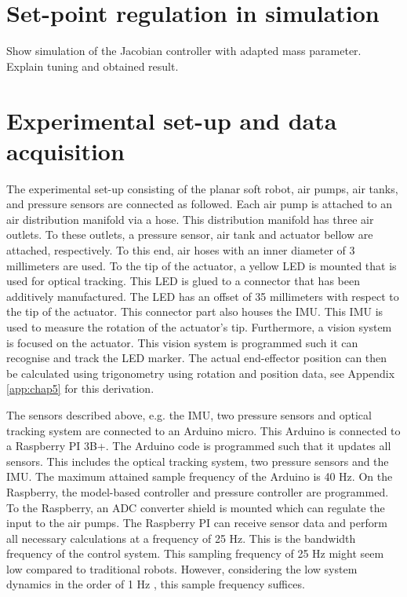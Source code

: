 \section{Set-point regulation in simulation}

Show simulation of the Jacobian controller with adapted mass parameter. Explain tuning and obtained result.


\section{Experimental set-up and data acquisition}

The experimental set-up consisting of the planar soft robot, air pumps, air tanks, and pressure sensors are connected as followed. Each air pump is attached to an air distribution manifold via a hose. This distribution manifold has three air outlets. To these outlets, a pressure sensor, air tank and actuator bellow are attached, respectively. To this end, air hoses with an inner diameter of 3 millimeters are used. To the tip of the actuator, a yellow LED is mounted that is used for optical tracking. This LED is glued to a connector that has been additively manufactured. The LED has an offset of 35 millimeters with respect to the tip of the actuator. This connector part also houses the IMU. This IMU is used to measure the rotation of the actuator's tip. Furthermore, a vision system is focused on the actuator. This vision system is programmed such it can recognise and track the LED marker. The actual end-effector position can then be calculated using trigonometry using rotation and position data, see Appendix \ref{app:chap5} for this derivation. 

The sensors described above, e.g. the IMU, two pressure sensors and optical tracking system are connected to an Arduino micro. This Arduino is connected to a Raspberry PI 3B+. The Arduino code is programmed such that it updates all sensors. This includes the optical tracking system, two pressure sensors and the IMU. The maximum attained sample frequency of the Arduino is 40 Hz. On the Raspberry, the model-based controller and pressure controller are programmed. To the Raspberry, an ADC converter shield is mounted which can regulate the input to the air pumps. The Raspberry PI can receive sensor data and perform all necessary calculations at a frequency of 25 Hz. This is the bandwidth frequency of the control system. This sampling frequency of 25 Hz might seem low compared to traditional robots. However, considering the low system dynamics in the order of 1 Hz \cite{tawk2018bioinspired},\cite{HighBandwidthControl} this sample frequency suffices.  

